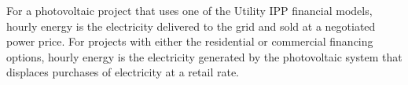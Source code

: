 \documentclass[12pt,letterpaper]{article}
\begin{document}
For a photovoltaic project that uses one of the Utility IPP financial models, hourly energy is the electricity delivered to the grid and sold at a negotiated power price. For projects with either the residential or commercial financing options, hourly energy is the electricity generated by the photovoltaic system that displaces purchases of electricity at a retail rate.



\cleardoublepage

\label{sec:Bib}
%
\end{document}
